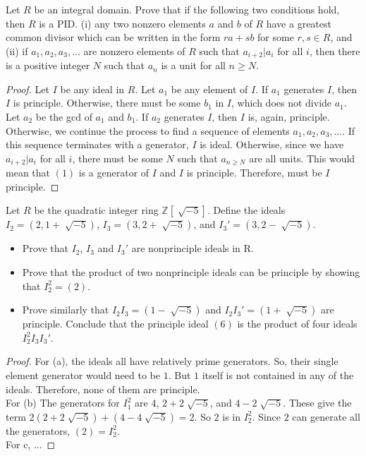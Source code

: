 \documentclass[10pt]{article}
\newenvironment{problem}[2][Problem]{\begin{trivlist}
		\item[\hskip \labelsep {\bfseries #1}\hskip \labelsep {\bfseries #2.}]}{\end{trivlist}}
\begin{document}
	\begin{problem}{2.4}
		Let $R$ be an integral domain. Prove that if the following two conditions hold, then $R$ is a PID.
		(i) any two nonzero elements $a$ and $b$ of $R$ have a greatest common divisor which can be written in the form $ra+sb$ for some $r,s \in R$, and (ii) if $a_{1}, a_{2}, a_{3}, ...$ are nonzero elements of $R$ such that $a_{i+2}|a_{i}$ for all $i$, then there is a positive integer $N$ such that $a_{n}$ is a unit for all $n \geq N$.
		\begin{proof}
			Let $I$ be any ideal in $R$. Let $a_{1}$ be any element of $I$. If $a_{1}$ generates $I$, then $I$ is principle. Otherwise, there must be some $b_{1}$ in $I$, which does not divide $a_{1}$. Let $a_{2}$ be the gcd of $a_{1}$ and $b_{1}$. If $a_{2}$ generates $I$, then $I$ is, again, principle. Otherwise, we continue the process to find a sequence of elements $a_{1}, a_{2}, a_{3}, ... $. If this sequence terminates with a generator, $I$ is ideal. Otherwise, since we have $a_{i+2}|a_{i}$ for all $i$, there must be some $N$ such that $a_{n \geq N}$ are all units. This would mean that $(1)$ is a generator of $I$ and $I$ is principle. Therefore, must be $I$ principle.
		\end{proof}
	\end{problem}
	
	\begin{problem}{2.5}
		Let $R$ be the quadratic integer ring $\mathbb{Z}[\sqrt[]{-5}]$. Define the ideals $I_{2}=(2,1+\sqrt[]{-5})$, $I_{3}=(3,2+\sqrt[]{-5})$, and $I_{3}'=(3,2-\sqrt[]{-5})$.
		\begin{itemize}
			\item[(a)] Prove that $I_{2}$, $I_{3}$ and $I_{3}'$ are nonprinciple ideals in R.
			\item[(b)] Prove that the product of two nonprinciple ideals can be principle by showing that $I_{2}^{2} = (2)$.
			\item[(c)] Prove similarly that $I_{2}I_{3}=(1-\sqrt[]{-5})$ and $I_{2}I_{3}'=(1+\sqrt[]{-5})$ are principle. Conclude that the principle ideal $(6)$ is the product of four ideals $I_{2}^{2}I_{3}I_{3}'$.
		\end{itemize}
		
		\begin{proof}
			For (a), the ideals all have relatively prime generators. So, their single element generator would need to be $1$. But $1$ itself is not contained in any of the ideals. Therefore, none of them are principle.\\
			For (b) The generators for $I_{1}^{2}$ are $4$, $2+2\sqrt[]{-5}$, and $4-2\sqrt[]{-5}$. These give the term $2(2+2\sqrt[]{-5}) + (4-4\sqrt[]{-5}) = 2$. So $2$ is in $I_{2}^{2}$. Since $2$ can generate all the generators, $(2)=I_{2}^{2}$.\\
			For c, ...
		\end{proof}
	\end{problem}
	
\end{document}
